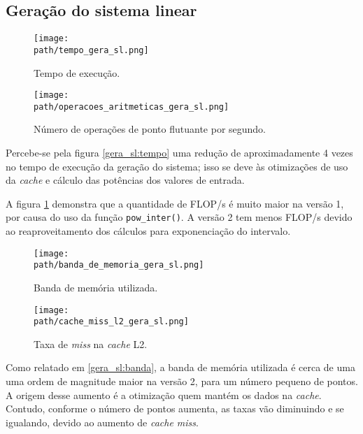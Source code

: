 \documentclass[a4paper, 11pt]{article}
\begin{document}
\subsection{Geração do sistema linear}
\label{subsecao:gera_sl}
\begin{figure}[!h]
    \centering
    \begin{minipage}{.5\textwidth}
        \centering
        \texttt{[image: \\path/tempo\_gera\_sl.png]}
        \caption{Tempo de execução.}
        \label{gera_sl:tempo}
    \end{minipage}\hfill
    
    \begin{minipage}{.5\textwidth}
        \centering
        \texttt{[image: \\path/operacoes\_aritmeticas\_gera\_sl.png]}
        \caption{Número de operações de ponto flutuante por segundo.}
        \label{gera_sl:flops}
    \end{minipage}
\end{figure}

Percebe-se pela figura \ref{gera_sl:tempo} uma redução de aproximadamente 4 vezes
no tempo de execução da geração do sistema; isso se deve às otimizações de uso da
\textit{cache} e cálculo das potências dos valores de entrada.

A figura \ref{gera_sl:flops} demonstra que a quantidade de FLOP/s é muito
maior na versão 1, por causa do uso da função \texttt{pow\_inter()}. A versão
2 tem menos FLOP/s devido ao reaproveitamento dos cálculos para exponenciação
do intervalo.

\begin{figure}[H]
    \centering
    \begin{minipage}{.5\textwidth}
        \centering
        \texttt{[image: \\path/banda\_de\_memoria\_gera\_sl.png]}
        \caption{Banda de memória utilizada.}
        \label{gera_sl:banda}
    \end{minipage}\hfill
    \begin{minipage}{.5\textwidth}
        \centering
        \texttt{[image: \\path/cache\_miss\_l2\_gera\_sl.png]}
        \caption{Taxa de \textit{miss} na \textit{cache} L2.}
        \label{gera_sl:cache_miss}
    \end{minipage}
\end{figure}

Como relatado em \ref{gera_sl:banda}, a banda de memória utilizada é cerca de uma
uma ordem de magnitude maior na versão 2, para um número pequeno de pontos. A origem
desse aumento é a otimização quem mantém os dados na \textit{cache}. Contudo,
conforme o número de pontos aumenta, as taxas vão diminuindo e se igualando, devido
ao aumento de \textit{cache miss}.
\end{document}
